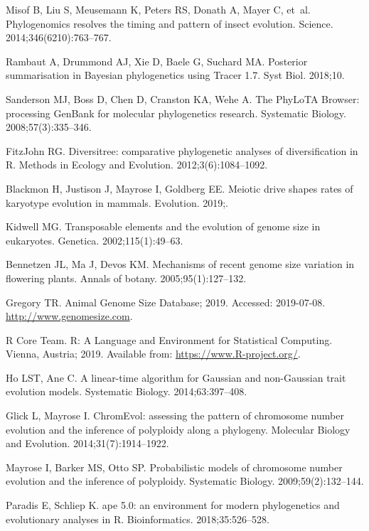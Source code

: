 \documentclass[]{rsos}%
\begin{document}
\begin{thebibliography}{9}
Misof B, Liu S, Meusemann K, Peters RS, Donath A, Mayer C, et~al.
 Phylogenomics resolves the timing and pattern of insect evolution.
 Science. 2014;346(6210):763--767.

Rambaut A, Drummond AJ, Xie D, Baele G, Suchard MA.
 Posterior summarisation in Bayesian phylogenetics using Tracer 1.7.
 Syst Biol. 2018;10.

Sanderson MJ, Boss D, Chen D, Cranston KA, Wehe A.
 The PhyLoTA Browser: processing GenBank for molecular phylogenetics
  research.
 Systematic Biology. 2008;57(3):335--346.

FitzJohn RG.
 Diversitree: comparative phylogenetic analyses of diversification in
  {R}.
 Methods in Ecology and Evolution. 2012;3(6):1084--1092.

Blackmon H, Justison J, Mayrose I, Goldberg EE.
 Meiotic drive shapes rates of karyotype evolution in mammals.
 Evolution. 2019;.

Kidwell MG.
 Transposable elements and the evolution of genome size in eukaryotes.
 Genetica. 2002;115(1):49--63.

Bennetzen JL, Ma J, Devos KM.
 Mechanisms of recent genome size variation in flowering plants.
 Annals of botany. 2005;95(1):127--132.

Gregory TR. Animal Genome Size Database; 2019.
 Accessed: 2019-07-08.
 \url{http://www.genomesize.com}.

{R Core Team}. R: A Language and Environment for Statistical Computing.
 Vienna, Austria; 2019.
 Available from: \url{https://www.R-project.org/}.
 
Ho LST, Ane C.
 A linear-time algorithm for Gaussian and non-Gaussian trait evolution
  models.
 Systematic Biology. 2014;63:397--408.

Glick L, Mayrose I.
 ChromEvol: assessing the pattern of chromosome number evolution and
  the inference of polyploidy along a phylogeny.
 Molecular Biology and Evolution. 2014;31(7):1914--1922.

Mayrose I, Barker MS, Otto SP.
 Probabilistic models of chromosome number evolution and the inference
  of polyploidy.
 Systematic Biology. 2009;59(2):132--144.

Paradis E, Schliep K.
 ape 5.0: an environment for modern phylogenetics and evolutionary
  analyses in {R}.
 Bioinformatics. 2018;35:526--528.


\end{thebibliography}
\end{document}
